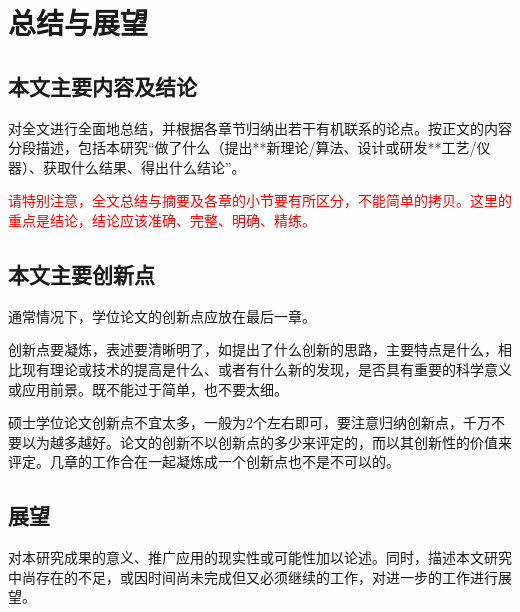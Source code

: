
\chapter{总结与展望}
\label{cha:conclusion}

\section{本文主要内容及结论}
\label{sec:conclusion}
对全文进行全面地总结，并根据各章节归纳出若干有机联系的论点。按正文的内容分段描述，包括本研究“做了什么（提出**新理论/算法、设计或研发**工艺/仪器）、获取什么结果、得出什么结论”。

\textcolor{red}{请特别注意，全文总结与摘要及各章的小节要有所区分，不能简单的拷贝。这里的重点是结论，结论应该准确、完整、明确、精练。}


\section{本文主要创新点}
\label{sec:conclusion}
通常情况下，学位论文的创新点应放在最后一章。

创新点要凝炼，表述要清晰明了，如提出了什么创新的思路，主要特点是什么，相比现有理论或技术的提高是什么、或者有什么新的发现，是否具有重要的科学意义或应用前景。既不能过于简单，也不要太细。

硕士学位论文创新点不宜太多，一般为2个左右即可，要注意归纳创新点，千万不要以为越多越好。论文的创新不以创新点的多少来评定的，而以其创新性的价值来评定。几章的工作合在一起凝炼成一个创新点也不是不可以的。


\section{展望}
\label{sec:conclusion}
对本研究成果的意义、推广应用的现实性或可能性加以论述。同时，描述本文研究中尚存在的不足，或因时间尚未完成但又必须继续的工作，对进一步的工作进行展望。